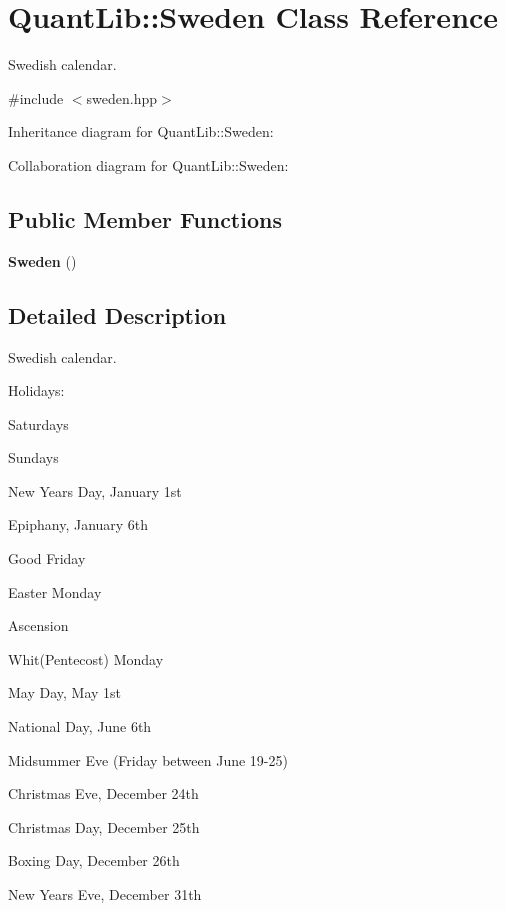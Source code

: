 \section{Quant\+Lib\+:\+:Sweden Class Reference}
\label{class_quant_lib_1_1_sweden}


Swedish calendar.  




{\ttfamily \#include $<$sweden.\+hpp$>$}



Inheritance diagram for Quant\+Lib\+:\+:Sweden\+:


Collaboration diagram for Quant\+Lib\+:\+:Sweden\+:
\subsection*{Public Member Functions}
\begin{DoxyCompactItemize}
\item 
{\bf Sweden} ()
\end{DoxyCompactItemize}


\subsection{Detailed Description}
Swedish calendar. 

Holidays\+: 
\begin{DoxyItemize}
\item Saturdays 
\item Sundays 
\item New Year\textquotesingle{}s Day, January 1st 
\item Epiphany, January 6th 
\item Good Friday 
\item Easter Monday 
\item Ascension 
\item Whit(\+Pentecost) Monday  
\item May Day, May 1st 
\item National Day, June 6th 
\item Midsummer Eve (Friday between June 19-\/25) 
\item Christmas Eve, December 24th 
\item Christmas Day, December 25th 
\item Boxing Day, December 26th 
\item New Year\textquotesingle{}s Eve, December 31th 
\end{DoxyItemize}

